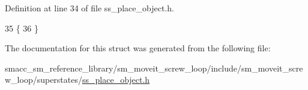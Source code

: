 Definition at line 34 of file ss\+\_\+place\+\_\+object.\+h.


\begin{DoxyCode}
35             \{
36             \}
\end{DoxyCode}


The documentation for this struct was generated from the following file\+:\begin{DoxyCompactItemize}
\item 
smacc\+\_\+sm\+\_\+reference\+\_\+library/sm\+\_\+moveit\+\_\+screw\+\_\+loop/include/sm\+\_\+moveit\+\_\+screw\+\_\+loop/superstates/\hyperlink{sm__moveit__screw__loop_2include_2sm__moveit__screw__loop_2superstates_2ss__place__object_8h}{ss\+\_\+place\+\_\+object.\+h}\end{DoxyCompactItemize}
